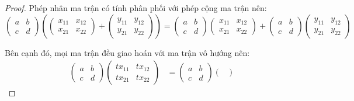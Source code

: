 \documentclass[class=linearalgebra,crop=false]{standalone}
\begin{document}
\begin{proof}
    Phép nhân ma trận có tính phân phối với phép cộng ma trận nên:
    \[
        \begin{pmatrix}
            a & b \\
            c & d
        \end{pmatrix}
        \left(
        \begin{pmatrix}
                x_{11} & x_{12} \\
                x_{21} & x_{22}
            \end{pmatrix}
        +
        \begin{pmatrix}
                y_{11} & y_{12} \\
                y_{21} & y_{22}
            \end{pmatrix}
        \right)
        =
        \begin{pmatrix}
            a & b \\
            c & d
        \end{pmatrix}
        \begin{pmatrix}
            x_{11} & x_{12} \\
            x_{21} & x_{22}
        \end{pmatrix}
        +
        \begin{pmatrix}
            a & b \\
            c & d
        \end{pmatrix}
        \begin{pmatrix}
            y_{11} & y_{12} \\
            y_{21} & y_{22}
        \end{pmatrix}
    \]
    \par Bên cạnh đó, mọi ma trận đều giao hoán với ma trận vô hướng nên:
    \begin{align*}
        \begin{pmatrix}
            a & b \\
            c & d
        \end{pmatrix}
        \begin{pmatrix}
            tx_{11} & tx_{12} \\
            tx_{21} & tx_{22}
        \end{pmatrix} & =
        \begin{pmatrix}
            a & b \\
            c & d
        \end{pmatrix}
        \begin{pmatrix}

\end{pmatrix}
\end{align*}
\end{proof}
\end{document}
